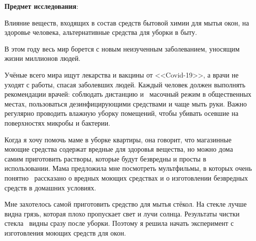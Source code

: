 \textbf{Предмет исследования}:

Влияние веществ, входящих в состав средств бытовой химии для мытья окон, на здоровье человека, альтернативные средства для уборки в быту.

В этом году весь мир борется с новым неизученным заболеванием, уносящим жизни миллионов людей.

Учёные всего мира ищут лекарства и вакцины от <<Covid-19>>, а врачи не уходят с работы, спасая заболевших людей. Каждый человек должен выполнять рекомендации врачей: соблюдать дистанцию и  масочный режим в общественных местах, пользоваться дезинфицирующими средствами и чаще мыть руки. Важно регулярно проводить влажную уборку помещений, чтобы убивать осевшие на поверхностях микробы и бактерии.

Когда я хочу помочь маме в уборке квартиры, она говорит, что магазинные моющие средства содержат вредные для здоровья вещества, но можно дома самим приготовить растворы, которые будут безвредны и просты в использовании. Мама предложила мне посмотреть мультфильмы, в которых очень понятно  рассказано о вредных моющих средствах и о изготовлении безвредных средств в домашних условиях.

Мне захотелось самой приготовить средство для мытья стёкол. На стекле лучше видна грязь, которая плохо пропускает свет и лучи солнца. Результаты чистки стекла  видны сразу после уборки. Поэтому я решила начать эксперимент с изготовления моющих средств для окон.
